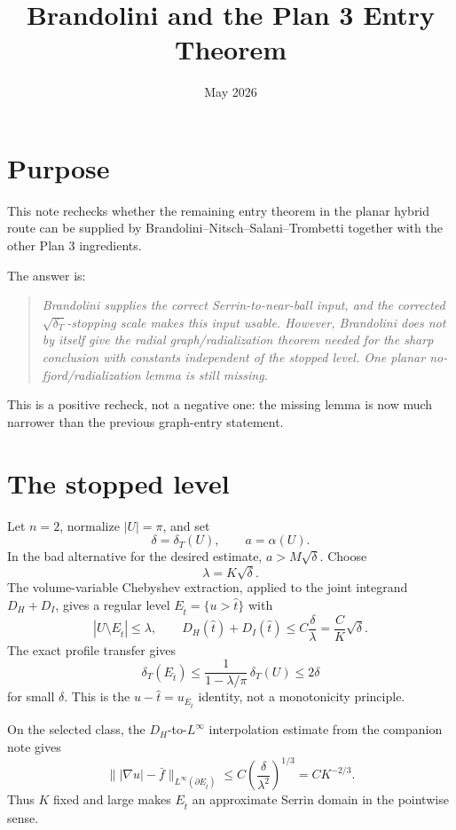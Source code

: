 \documentclass[11pt]{article}
\title{Brandolini and the Plan 3 Entry Theorem}
\author{}
\date{May 2026}
\newcommand{\dT}{\delta_T}
\newcommand{\Et}{E_{\hat t}}
\begin{document}
\maketitle

\section{Purpose}

This note rechecks whether the remaining entry theorem in the planar hybrid
route can be supplied by Brandolini--Nitsch--Salani--Trombetti together with
the other Plan 3 ingredients.

The answer is:

\begin{quote}
\emph{Brandolini supplies the correct Serrin-to-near-ball input, and the
corrected \(\sqrt{\dT}\)-stopping scale makes this input usable.  However,
Brandolini does not by itself give the radial graph/radialization theorem
needed for the sharp conclusion with constants independent of the stopped
level.  One planar no-fjord/radialization lemma is still missing.}
\end{quote}

This is a positive recheck, not a negative one: the missing lemma is now much
narrower than the previous graph-entry statement.

\section{The stopped level}

Let \(n=2\), normalize \(|U|=\pi\), and set
\[
   \delta=\dT(U),\qquad a=\alpha(U).
\]
In the bad alternative for the desired estimate, \(a>M\sqrt\delta\).  Choose
\[
   \lambda=K\sqrt\delta.
\]
The volume-variable Chebyshev extraction, applied to the joint integrand
\(D_H+D_I\), gives a regular level \(\Et=\{u>\hat t\}\) with
\[
   |U\setminus \Et|\le \lambda,\qquad
   D_H(\hat t)+D_I(\hat t)\le C\frac{\delta}{\lambda}
      =\frac{C}{K}\sqrt\delta .
   \tag{2.1}\label{eq:good-level}
\]
The exact profile transfer gives
\[
   \dT(\Et)\le \frac{1}{1-\lambda/\pi}\,\dT(U)\le 2\delta
   \tag{2.2}\label{eq:def-transfer}
\]
for small \(\delta\).  This is the \(u-\hat t=u_{\Et}\) identity, not a
monotonicity principle.

On the selected class, the \(D_H\)-to-\(L^\infty\) interpolation estimate
from the companion note gives
\[
   \bigl\||\nabla u|-\bar f\bigr\|_{L^\infty(\partial\Et)}
      \le
   C\left(\frac{\delta}{\lambda^2}\right)^{1/3}
      = C K^{-2/3}.
   \tag{2.3}\label{eq:linfty-serrin}
\]
Thus \(K\) fixed and large makes \(\Et\) an approximate Serrin domain in the
pointwise sense.
\end{document}
